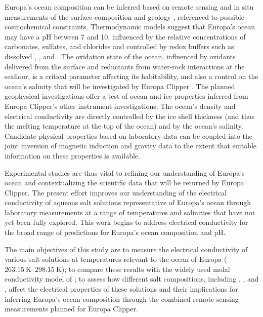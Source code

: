 \documentclass[journal=aesccq,manuscript=article]{achemso}
\begin{document}
 Europa's ocean composition can be inferred based on remote sensing and in situ measurements of the surface composition and geology  \cite{becker2024exploring}, referenced to possible cosmochemical constraints\cite{melwani2021metamorphic}. 
 Thermodynamic models suggest that Europa’s ocean may have a pH between 7 and 10, influenced by the relative concentrations of carbonates, sulfates, and chlorides and controlled by redox buffers such as dissolved , , and .
The oxidation state of the ocean, influenced by oxidants delivered from the surface and reductants from water-rock interactions at the seafloor, is a critical parameter affecting its habitability, and also a control on the ocean's salinity that will be investigated by Europa Clipper \cite{vance2016geophysical,vance2023investigating}. The planned geophysical investigations offer a test of ocean and ice properties inferred from Europa Clipper's other instrument investigations.
The ocean's density and electrical conductivity are directly controlled by the ice shell thickness (and thus the melting temperature at the top of the ocean) and by the ocean's salinity.
Candidate physical properties based on laboratory data can be coupled into the joint inversion of magnetic induction and gravity data to the extent that suitable information on these properties is available.


Experimental studies are thus vital to refining our understanding of Europa's ocean and contextualizing the scientific data that will be returned by Europa Clipper. The present effort improves our understanding of the electrical conductivity of aqueous salt solutions representative of Europa’s ocean through laboratory measurements at a range of temperatures and salinities that have not yet been fully explored. This work begins to address electrical conductivity for the broad range of predictions for Europa's ocean composition and pH\cite{weber2023review}. 

The main objectives of this study are to measure the electrical conductivity of various salt solutions at temperatures relevant to the ocean of Europa ($\SIrange[]{263.15}{298.15}{\kelvin}$); to compare these results with the widely used molal conductivity model of \citeauthor{McCleskey2012}; to assess how different salt compositions, including , ,  and , affect the electrical properties of these solutions and their implications for inferring Europa’s ocean composition through the combined remote sensing measurements planned for Europa Clipper. 
\end{document}
